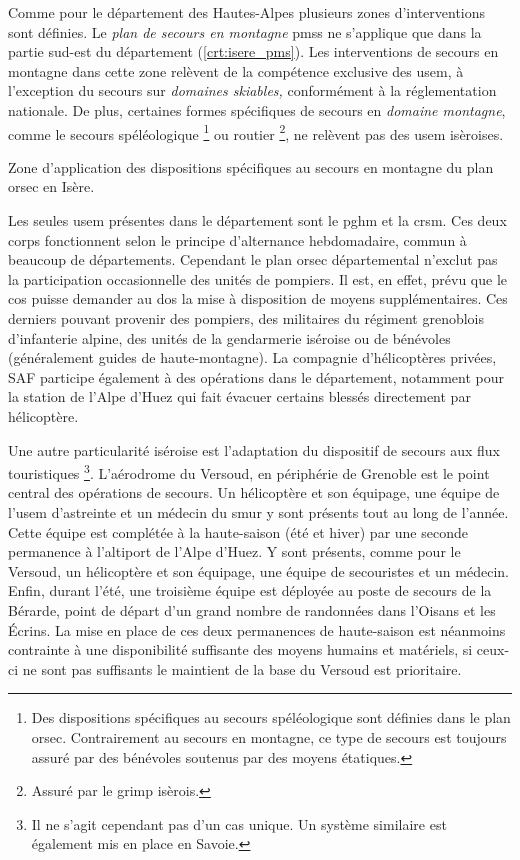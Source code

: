 Comme pour le département des Hautes-Alpes plusieurs zones
d'interventions sont définies. Le \emph{plan de secours en montagne}
\acp{pms} ne s'applique que dans la partie sud-est du département
(\autoref{crt:isere_pms}). Les interventions de secours en montagne
dans cette zone relèvent de la compétence exclusive des \ac{usem}, à
l'exception du secours sur \emph{domaines skiables,} conformément à la
réglementation nationale. De plus, certaines formes spécifiques de
secours en \emph{domaine montagne}, comme le secours spéléologique
\footnote{Des dispositions spécifiques au secours spéléologique sont
  définies dans le plan \ac{orsec}. Contrairement au secours en
  montagne, ce type de secours est toujours assuré par des bénévoles
  soutenus par des moyens étatiques.} ou routier \footnote{Assuré par
  le \ac{grimp} isèrois.}, ne relèvent pas des \ac{usem} isèroises.

\begin{carte}
  \centering
  
  \caption{Zone d'application des dispositions spécifiques au secours
    en montagne du plan \ac{orsec} en Isère.}
  \label{crt:isere_psm}
\end{carte}

Les seules \ac{usem} présentes dans le département sont le \ac{pghm}
et la \ac{crsm}. Ces deux corps fonctionnent selon le principe
d'alternance hebdomadaire, commun à beaucoup de
départements. Cependant le plan \ac{orsec} départemental n’exclut pas
la participation occasionnelle des unités de pompiers. Il est, en
effet, prévu que le \ac{cos} puisse demander au \ac{dos} la mise à
disposition de moyens supplémentaires. Ces derniers pouvant provenir
des pompiers, des militaires du régiment grenoblois d’infanterie
alpine, des unités de la gendarmerie iséroise ou de bénévoles
(généralement guides de haute-montagne).
La compagnie d'hélicoptères privées, SAF participe également à des
opérations dans le département, notamment pour la station de l'Alpe
d'Huez qui fait évacuer certains blessés directement par hélicoptère.

Une autre particularité iséroise est l'adaptation du dispositif de
secours aux flux touristiques \footnote{Il ne s'agit cependant pas
  d'un cas unique. Un système similaire est également mis en place en
  Savoie.}. L'aérodrome du Versoud, en périphérie de Grenoble est le
point central des opérations de secours. Un hélicoptère et son
équipage, une équipe de l'\ac{usem} d'astreinte et un médecin du
\ac{smur} y sont présents tout au long de l'année. Cette équipe est
complétée à la haute-saison (été et hiver) par une seconde permanence
à l'altiport de l'Alpe d'Huez. Y sont présents, comme pour le Versoud,
un hélicoptère et son équipage, une équipe de secouristes et un
médecin. Enfin, durant l'été, une troisième équipe est déployée au
poste de secours de la Bérarde, point de départ d'un grand nombre de
randonnées dans l'Oisans et les Écrins. La mise en place de ces deux
permanences de haute-saison est néanmoins contrainte à une
disponibilité suffisante des moyens humains et matériels, si ceux-ci
ne sont pas suffisants le maintient de la base du Versoud est
prioritaire.

